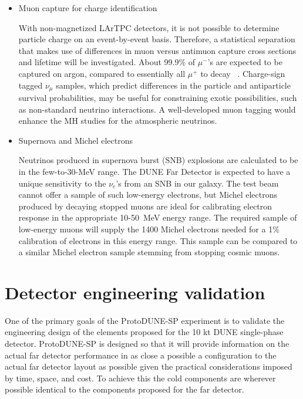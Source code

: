 \begin{itemize}
\item Muon capture for charge identification

With non-magnetized LArTPC detectors, it is not possible to determine particle charge on an event-by-event basis. Therefore, a statistical separation that makes use of differences in muon versus antimuon capture cross sections and lifetime will be investigated.
About 99.9\% of $\mu^-$'s are expected to be captured on argon, compared to essentially all $\mu^+$ to decay ~\cite{stopmu}.
Charge-sign tagged $\nu_\mu$ samples, which predict differences in the particle and antiparticle survival probabilities, may be useful for constraining exotic possibilities, such as non-standard neutrino interactions. 
A well-developed muon tagging would enhance the MH studies for the atmospheric neutrinos. 

\item Supernova and Michel electrons

Neutrinos produced in supernova burst (SNB) explosions are calculated to be in the few-to-30-MeV range.
The DUNE Far Detector is expected to have a unique sensitivity to the $\nu_e$'s from an SNB in our galaxy.
%
The test beam cannot offer a sample of such low-energy electrons, but Michel electrons produced by decaying stopped muons are ideal for calibrating electron response in the appropriate 10-50~MeV energy range. 
The required  sample of low-energy muons will supply the 1400 Michel electrons needed for a 1\%  calibration of electrons in this energy range. This sample can be compared to a similar Michel electron sample
stemming from stopping cosmic muons.

\end{itemize}



\section{Detector engineering validation}

One of the primary goals of the ProtoDUNE-SP experiment is to validate the engineering design of the elements proposed for the 10 kt DUNE single-phase detector. ProtoDUNE-SP is designed so that it will provide information on the actual far detector performance in as close a possible a configuration to the actual far detector layout as possible given the practical considerations imposed by time, space, and cost. To achieve this the cold components are wherever possible identical to the components proposed for the far detector. 

